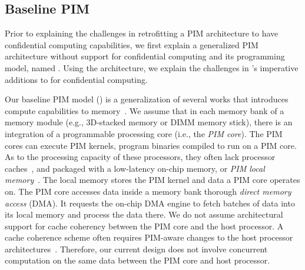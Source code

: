
\subsection{Baseline PIM}   
Prior to explaining the challenges in retrofitting a PIM architecture to have confidential computing capabilities, we first explain a generalized PIM architecture without support for confidential computing and its programming model, named \baseline. Using the \baseline architecture, we explain the challenges in \thename's imperative additions to \baseline for confidential computing.

 Our baseline PIM model (\baseline) is a generalization of several works that introduces compute capabilities to memory~\cite{upmem-atc,tesseract}. We assume that in each memory bank of a memory module (e.g., 3D-stacked memory or DIMM memory stick), there is an integration of a programmable processing core (i.e., the \emph{PIM core}). The PIM cores can execute PIM kernels, program binaries compiled to run on a PIM core. As to the processing capacity of these processors, they often lack processor caches~\cite{upmem,smcsim,top-pim,neural-network-training}, and packaged with a low-latency on-chip memory, or \emph{PIM local memory}~\cite{smcsim,upmem,cho2020accelerating}. The local memory stores the PIM kernel and data a PIM core operates on. The PIM core accesses data inside a memory bank thorough \emph{direct memory access} (DMA). It requests the on-chip DMA engine to fetch batches of data into its local memory and process the data there. We do not assume architectural support for cache coherency between the PIM core and the host processor. A cache coherence scheme often requires PIM-aware changes to the host processor architectures~\cite{pei,conda}. Therefore, our current design does not involve concurrent computation on the same data between the PIM core and host processor.


